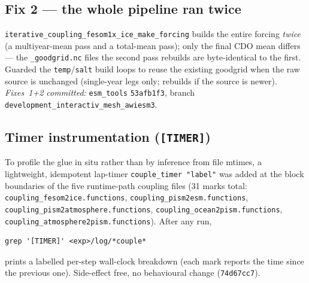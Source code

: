 \documentclass[11pt,a4paper]{article}
\newcommand{\code}[1]{\texttt{\small #1}}
\newcommand{\file}[1]{\texttt{\footnotesize #1}}
\begin{document}
\subsection{Fix 2 --- the whole pipeline ran twice}
\code{iterative\_coupling\_fesom1x\_ice\_make\_forcing} builds the entire forcing \emph{twice} (a
multiyear-mean pass and a total-mean pass); only the final CDO mean differs --- the
\code{*\_goodgrid.nc} files the second pass rebuilds are byte-identical to the first. Guarded the
\code{temp}/\code{salt} build loops to reuse the existing goodgrid when the raw source is
unchanged (single-year legs only; rebuilds if the source is newer). \emph{Fixes~1+2 committed:}
\code{esm\_tools} \code{53afb1f3}, branch \code{development\_interactiv\_mesh\_awiesm3}.

\subsection{Timer instrumentation (\code{[TIMER]})}
To profile the glue in situ rather than by inference from file mtimes, a lightweight,
idempotent lap-timer \code{couple\_timer "label"} was added at the block boundaries of the five
runtime-path coupling files (31 marks total: \file{coupling\_fesom2ice.functions},
\file{coupling\_pism2esm.functions}, \file{coupling\_pism2atmosphere.functions},
\file{coupling\_ocean2pism.functions}, \file{coupling\_atmosphere2pism.functions}). After any run,
\begin{lstlisting}
grep '[TIMER]' <exp>/log/*couple*
\end{lstlisting}
prints a labelled per-step wall-clock breakdown (each mark reports the time since the previous
one). Side-effect free, no behavioural change (\code{74d67cc7}).
\end{document}
